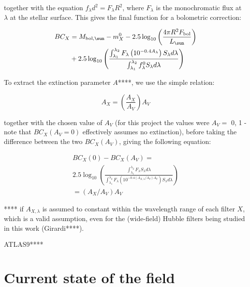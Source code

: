 \documentclass[usenatbib]{mnras}
\begin{document}
together with the equation $f_{\lambda}d^{2}=F_{\lambda}R^{2}$, where $F_{\lambda}$ is the monochromatic flux at $\lambda$ at the stellar surface. This gives the final function for a bolometric correction:

\begin{align}
BC_{X} &= M_{\textnormal{bol},\sun} - m_{X}^{0} - 2.5 \log_{10} \left( \frac{4\pi R^{2}F_{\textnormal{bol}}}{L_{\sun}} \right) \\ &+ 2.5 \log_{10} \left( \frac{\int_{\lambda_{1}}^{\lambda_{2}} F_{\lambda} \left( 10^{-0.4 A_{\lambda}} \right) S_{\lambda} d\lambda}{\int_{\lambda_{1}}^{\lambda_{2}} f_{\lambda}^{0} S_{\lambda} d\lambda} \right)
\label{BC_extinc}
\end{align}


To extract the extinction parameter $A$****, we use the simple relation:

\begin{equation}
A_{X} = \left( \frac{A_{X}}{A_{V}} \right) A_{V}
\label{ratio_eq}
\end{equation}

together with the chosen value of $A_{V}$ (for this project the values were $A_{V} =$ 0, 1 - note that $BC_{X}(A_{V}=0)$  effectively assumes no extinction), before taking the difference between the two $BC_{X}(A_{V})$, giving the following equation:

\begin{multline}
BC_{X}(0) - BC_{X}(A_{V}) = \\ 2.5 \log_{10} \left( \frac{\int_{\lambda_{1}}^{\lambda_{2}} F_{\lambda}  S_{\lambda} d\lambda}{\int_{\lambda_{1}}^{\lambda_{2}} F_{\lambda}\left( 10^{-0.4 \left(A_{X,\lambda}/A_{V}\right)A_{V}} \right) S_{\lambda} d\lambda} \right)
\\ = \left(A_{X}/A_{V}\right)A_{V}
\label{BCs_diff}
\end{multline}

**** if $A_{X,\lambda}$ is assumed to constant within the wavelength range of each filter $X$, which is a valid assumption, even for the (wide-field) Hubble filters being studied in this work (Girardi****).

ATLAS9****

\section{Current state of the field}
\end{document}
